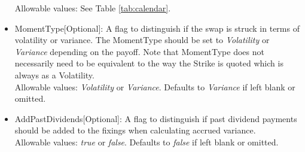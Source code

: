 \begin{itemize}
	Allowable values: See Table \ref{tab:calendar}.
	\item MomentType[Optional]: A flag to distinguish if the swap is struck in terms of volatility or variance. The MomentType should be set to \emph{Volatility} or \emph{Variance} depending on the payoff.  Note that MomentType does not necessarily need to be equivalent to the way the Strike is quoted which is always as a Volatility. \\
	Allowable values: \emph{Volatility} or \emph{Variance}. Defaults to \emph{Variance} if left blank or omitted.
	\item AddPastDividends[Optional]: A flag to distinguish if past dividend payments should be added to the fixings when calculating accrued variance. \\
	Allowable values: \emph{true} or \emph{false}. Defaults to \emph{false} if left blank or omitted.
\end{itemize}
